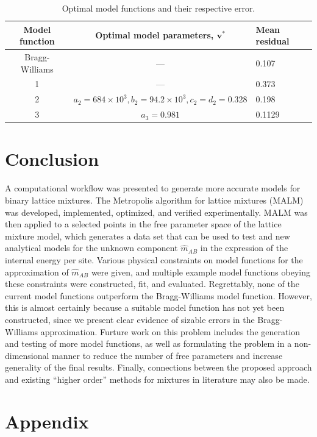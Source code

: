 \documentclass[10pt]{article}
\begin{document}
\begin{table}[h!]
    \caption{Optimal model functions and their respective error.}
    \begin{center}
    \begin{tabular}{c | c | l} 
        \hline
        Model function & Optimal model parameters, $\mathbf{v}^*$ & Mean residual \\  \hline
        Bragg-Williams & --- & 0.107 \\ \hline
        1 & --- & 0.373 \\ \hline
        2 & $a_2=684 \times 10^3, b_2=94.2 \times 10^3, c_2=d_2=0.328$ & 0.198 \\ \hline
        3 & $a_3 = 0.981$ & 0.1129
        \label{tbl:model_errors}
    \end{tabular}
    \end{center}
\end{table}


\section{Conclusion}

A computational workflow was presented to generate more accurate models for binary lattice mixtures.
The Metropolis algorithm for lattice mixtures (MALM) was developed, implemented, optimized, and verified experimentally.
MALM was then applied to a selected points in the free parameter space of the lattice mixture model, which generates a data set that can be used to test and new analytical models for the unknown component $\hat{m}_{AB}$ in the expression of the internal energy per site.
Various physical constraints on model functions for the approximation of $\hat{m}_{AB}$ were given, and multiple example model functions obeying these constraints were constructed, fit, and evaluated.
Regrettably, none of the current model functions outperform the Bragg-Williams model function.
However, this is almost certainly because a suitable model function has not yet been constructed, since we present clear evidence of sizable errors in the Bragg-Williams approximation.
Furture work on this problem includes the generation and testing of more model functions, as well as formulating the problem in a non-dimensional manner to reduce the number of free parameters and increase generality of the final results.
Finally, connections between the proposed approach and existing ``higher order'' methods for mixtures in literature may also be made.


\clearpage
\section{Appendix}
\end{document}
